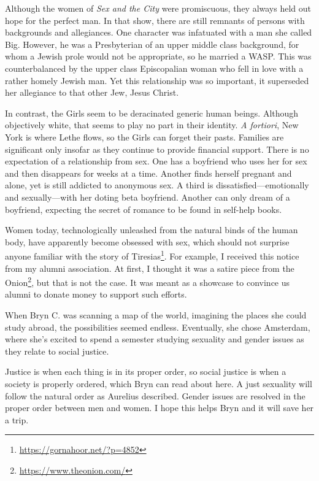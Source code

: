 Although the women of \textit{Sex and the City} were promiscuous, they always held out hope for the perfect man. In that show, there are still remnants of persons with backgrounds and allegiances. One character was infatuated with a man she called Big. However, he was a Presbyterian of an upper middle class background, for whom a Jewish prole would not be appropriate, so he married a WASP. This was counterbalanced by the upper class Episcopalian woman who fell in love with a rather homely Jewish man. Yet this relationship was so important, it superseded her allegiance to that other Jew, Jesus Christ.

In contrast, the Girls seem to be deracinated generic human beings. Although objectively white, that seems to play no part in their identity. \emph{A fortiori}, New York is where Lethe flows, so the Girls can forget their pasts. Families are significant only insofar as they continue to provide financial support. There is no expectation of a relationship from sex. One has a boyfriend who uses her for sex and then disappears for weeks at a time. Another finds herself pregnant and alone, yet is still addicted to anonymous sex. A third is dissatisfied---emotionally and sexually---with her doting beta boyfriend. Another can only dream of a boyfriend, expecting the secret of romance to be found in self-help books.

Women today, technologically unleashed from the natural binds of the human body, have apparently become obsessed with sex, which should not surprise anyone familiar with the story of Tiresias\footnote{\url{https://gornahoor.net/?p=4852}}. For example, I received this notice from my alumni association. At first, I thought it was a satire piece from the Onion\footnote{\url{https://www.theonion.com/}}, but that is not the case. It was meant as a showcase to convince us alumni to donate money to support such efforts.

\begin{quotex}
When Bryn C. was scanning a map of the world, imagining the places she could study abroad, the possibilities seemed endless. Eventually, she chose Amsterdam, where she's excited to spend a semester studying sexuality and gender issues as they relate to social justice.
\end{quotex}


Justice is when each thing is in its proper order, so social justice is when a society is properly ordered, which Bryn can read about here. A just sexuality will follow the natural order as Aurelius described. Gender issues are resolved in the proper order between men and women. I hope this helps Bryn and it will save her a trip.


